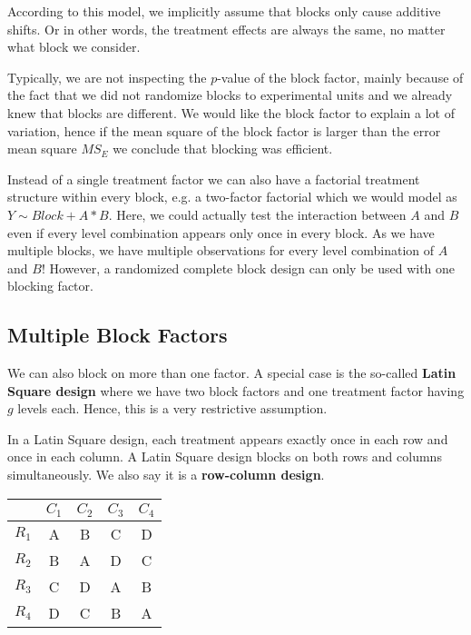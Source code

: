According to this model, we implicitly assume that blocks only cause additive shifts. Or in other words, the treatment effects are always the same, no matter what block we consider.\medskip

Typically, we are not inspecting the $p$-value of the block factor, mainly because of the fact that we did not randomize blocks to experimental units and we already knew that blocks are different. We would like the block factor to explain a lot of variation, hence if the mean square of the block factor is larger than the error mean square $MS_E$ we conclude that blocking was efficient. \medskip

Instead of a single treatment factor we can also have a factorial treatment structure within every block, e.g. a two-factor factorial which we would model as $Y \sim Block + A * B$. Here, we could actually test the interaction between $A$ and $B$ even if every level combination appears only once in every block. As we have multiple blocks, we have multiple observations for every level combination of $A$ and $B$! However, a randomized complete block design can only be used with one blocking factor.


\subsection{Multiple Block Factors}

We can also block on more than one factor. A special case is the so-called \textbf{Latin Square design} where we have two block factors and one treatment factor having $g$ levels each. Hence, this is a very restrictive assumption. \medskip

In a Latin Square design, each treatment appears exactly once in each row and once in each column. A Latin Square design blocks on both rows and columns simultaneously. We also say it is a \textbf{row-column design}.
\begin{center}
	\begin{tabular}{c c c c c}
		 & $C_1$ & $C_2$ & $C_3$ & $C_4$\\ \hline
		 $R_1$ & A & B & C & D \\ \hline
		 $R_2$ & B & A & D & C \\ \hline
		 $R_3$ & C & D & A & B \\ \hline
		 $R_4$ & D & C & B & A \\ \hline
	\end{tabular}
\end{center}

